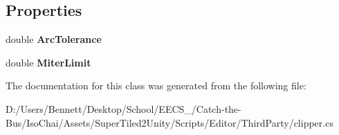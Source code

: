 \subsection*{Properties}
\begin{DoxyCompactItemize}
\item 
\mbox{\label{class_super_tiled2_unity_1_1_editor_1_1_clipper_lib_1_1_clipper_offset_a540dca0eabee542892e885b5421fb19f}} 
double {\bfseries Arc\+Tolerance}
\item 
\mbox{\label{class_super_tiled2_unity_1_1_editor_1_1_clipper_lib_1_1_clipper_offset_aa1eff163c6944a4c4cb5ffd72cbe4acc}} 
double {\bfseries Miter\+Limit}
\end{DoxyCompactItemize}


The documentation for this class was generated from the following file\+:\begin{DoxyCompactItemize}
\item 
D\+:/\+Users/\+Bennett/\+Desktop/\+School/\+E\+E\+C\+S\+\_/\+Catch-\/the-\/\+Bus/\+Iso\+Chai/\+Assets/\+Super\+Tiled2\+Unity/\+Scripts/\+Editor/\+Third\+Party/clipper.\+cs\end{DoxyCompactItemize}
